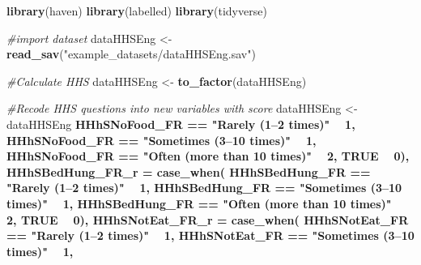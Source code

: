 \documentclass[
]{book}
\newenvironment{Shaded}{\begin{snugshade}}{\end{snugshade}}
\newcommand{\CommentTok}[1]{\textcolor[rgb]{0.56,0.35,0.01}{\textit{#1}}}
\newcommand{\DataTypeTok}[1]{\textcolor[rgb]{0.13,0.29,0.53}{#1}}
\newcommand{\DecValTok}[1]{\textcolor[rgb]{0.00,0.00,0.81}{#1}}
\newcommand{\KeywordTok}[1]{\textcolor[rgb]{0.13,0.29,0.53}{\textbf{#1}}}
\newcommand{\NormalTok}[1]{#1}
\newcommand{\OperatorTok}[1]{\textcolor[rgb]{0.81,0.36,0.00}{\textbf{#1}}}
\newcommand{\OtherTok}[1]{\textcolor[rgb]{0.56,0.35,0.01}{#1}}
\newcommand{\StringTok}[1]{\textcolor[rgb]{0.31,0.60,0.02}{#1}}
\begin{document}
\begin{Shaded}
\begin{Highlighting}[]
\KeywordTok{library}\NormalTok{(haven)}
\KeywordTok{library}\NormalTok{(labelled)}
\KeywordTok{library}\NormalTok{(tidyverse)}

\CommentTok{#import dataset}
\NormalTok{dataHHSEng <-}\StringTok{ }\KeywordTok{read_sav}\NormalTok{(}\StringTok{"example_datasets/dataHHSEng.sav"}\NormalTok{)}

\CommentTok{#Calculate HHS }
\NormalTok{dataHHSEng <-}\StringTok{ }\KeywordTok{to_factor}\NormalTok{(dataHHSEng)}

\CommentTok{#Recode HHS questions into new variables with score }
\NormalTok{dataHHSEng <-}\StringTok{ }\NormalTok{dataHHSEng }\OperatorTok{%>%}\StringTok{ }\KeywordTok{mutate}\NormalTok{(}\DataTypeTok{HHhSNoFood_FR_r =} \KeywordTok{case_when}\NormalTok{(}
\NormalTok{                                      HHhSNoFood_FR }\OperatorTok{==}\StringTok{ "Rarely (1–2 times)"} \OperatorTok{~}\StringTok{ }\DecValTok{1}\NormalTok{,}
\NormalTok{                                      HHhSNoFood_FR }\OperatorTok{==}\StringTok{ "Sometimes (3–10 times)"} \OperatorTok{~}\StringTok{ }\DecValTok{1}\NormalTok{,}
\NormalTok{                                      HHhSNoFood_FR }\OperatorTok{==}\StringTok{ "Often (more than 10 times)"} \OperatorTok{~}\StringTok{ }\DecValTok{2}\NormalTok{,}
                                      \OtherTok{TRUE} \OperatorTok{~}\StringTok{ }\DecValTok{0}\NormalTok{),}
                                    \DataTypeTok{HHhSBedHung_FR_r =} \KeywordTok{case_when}\NormalTok{(}
\NormalTok{                                      HHhSBedHung_FR }\OperatorTok{==}\StringTok{ "Rarely (1–2 times)"} \OperatorTok{~}\StringTok{ }\DecValTok{1}\NormalTok{,}
\NormalTok{                                      HHhSBedHung_FR }\OperatorTok{==}\StringTok{ "Sometimes (3–10 times)"} \OperatorTok{~}\StringTok{ }\DecValTok{1}\NormalTok{,}
\NormalTok{                                      HHhSBedHung_FR }\OperatorTok{==}\StringTok{ "Often (more than 10 times)"} \OperatorTok{~}\StringTok{ }\DecValTok{2}\NormalTok{,}
                                      \OtherTok{TRUE} \OperatorTok{~}\StringTok{ }\DecValTok{0}\NormalTok{),}
                                    \DataTypeTok{HHhSNotEat_FR_r =} \KeywordTok{case_when}\NormalTok{(}
\NormalTok{                                      HHhSNotEat_FR }\OperatorTok{==}\StringTok{ "Rarely (1–2 times)"} \OperatorTok{~}\StringTok{ }\DecValTok{1}\NormalTok{,}
\NormalTok{                                      HHhSNotEat_FR }\OperatorTok{==}\StringTok{ "Sometimes (3–10 times)"} \OperatorTok{~}\StringTok{ }\DecValTok{1}\NormalTok{,}
}
\end{Highlighting}
\end{Shaded}
\end{document}
